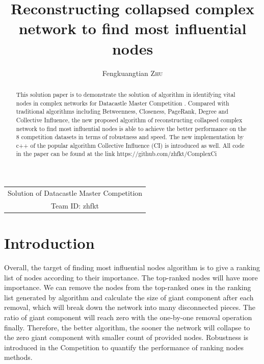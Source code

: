 \documentclass{article}
\title{ Reconstructing collapsed complex network to find most influential nodes  } %
\author{Fengkuangtian \textsc{Zhu}} %
\begin{document}
	
	\maketitle %
	
	
	
	\begin{center}
		\begin{tabular}{c}
			Solution of Datacastle Master Competition	\\
			Team ID: zhfkt 
		\end{tabular}
	\end{center}
	
	\begin{abstract}
		This solution paper is to demonstrate the solution of algorithm in identifying vital nodes in complex networks for Datacastle Master Competition . Compared with traditional algorithms including Betweenness\cite{wikiBetweennesscentrality}, Closeness\cite{wikiClosenesscentrality}, PageRank\cite{wikiPageRank}, Degree\cite{wikiCentrality} and Collective Influence\cite{morone2015influence}\cite{morone2016collective}, the new proposed algorithm of reconstructing collapsed complex network to find most influential nodes is able to achieve the better performance on the 8 competition datasets in terms of robustness\cite{schneider2011mitigation} and speed. The new implementation by c++ of the popular algorithm Collective Influence (CI) is introduced as well. All code in the paper can be found at the link https://github.com/zhfkt/ComplexCi \cite{zhfktgithub} \cite{zhfkt2017887989}
	\end{abstract}

	\section{Introduction}


	Overall, the target of finding most influential nodes algorithm is to give a ranking list of nodes according to their importance. The top-ranked nodes will have more importance. We can remove the nodes from the top-ranked ones in the ranking list generated by algorithm and calculate the size of giant component after each removal, which will break down the network into many disconnected pieces. The ratio of giant component will reach zero with the one-by-one removal operation finally. Therefore, the better algorithm, the sooner the network will collapse to the zero giant component with smaller count of provided nodes. Robustness \cite{schneider2011mitigation} is introduced in the Competition to quantify the performance of ranking nodes methods. 
	
\end{document}
